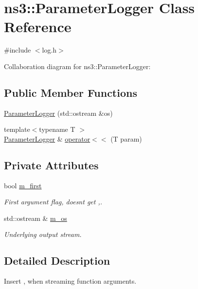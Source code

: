 \hypertarget{classns3_1_1ParameterLogger}{}\section{ns3\+:\+:Parameter\+Logger Class Reference}
\label{classns3_1_1ParameterLogger}


{\ttfamily \#include $<$log.\+h$>$}



Collaboration diagram for ns3\+:\+:Parameter\+Logger\+:
\subsection*{Public Member Functions}
\begin{DoxyCompactItemize}
\item 
\hyperlink{classns3_1_1ParameterLogger_a7a47f8ded70820d174a8d3a0dea73865}{Parameter\+Logger} (std\+::ostream \&os)
\item 
{\footnotesize template$<$typename T $>$ }\\\hyperlink{classns3_1_1ParameterLogger}{Parameter\+Logger} \& \hyperlink{classns3_1_1ParameterLogger_a6c416ba8fb2386dc3d97abb9932168af}{operator$<$$<$} (T param)
\end{DoxyCompactItemize}
\subsection*{Private Attributes}
\begin{DoxyCompactItemize}
\item 
bool \hyperlink{classns3_1_1ParameterLogger_a3c5e0b667c7b3fcccd97859e12897db5}{m\+\_\+first}
\begin{DoxyCompactList}\small\item\em First argument flag, doesn\textquotesingle{}t get {\ttfamily ,}. \end{DoxyCompactList}\item 
std\+::ostream \& \hyperlink{classns3_1_1ParameterLogger_a9a3b6e8560a52ca48cd97f1e16696b43}{m\+\_\+os}
\begin{DoxyCompactList}\small\item\em Underlying output stream. \end{DoxyCompactList}\end{DoxyCompactItemize}


\subsection{Detailed Description}
Insert {\ttfamily ,} when streaming function arguments. 


